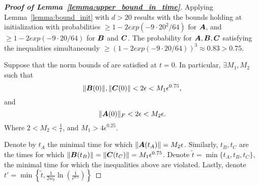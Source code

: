 \begin{proof}[\textbf{Proof of Lemma~\ref{lemma:upper_bound_in_time}}]
%
Applying Lemma~\ref{lemma:bound_init} with $d>20$ results with the bounds holding at initialization with probabilities $\ge 1-2exp(-9\cdot 20^2/64)$ for ${\bm{A}}$, and $\ge 1-2exp(-9\cdot 20/64)$ for ${\bm{B}}$ and ${\bm{C}}$. The probability for ${\bm{A}},{\bm{B}},{\bm{C}}$ satisfying the inequalities simultaneously $\ge \left(1-2exp(-9\cdot 20 /64)\right)^3\approx 0.83>0.75$.

Suppose that the norm bounds of  are satisfied at $t=0$. In particular, $\exists M_1,M_2$ such that 
\begin{equation}
    \|{\bm{B}}(0)\|,\|{\bm{C}}(0)\|<2\epsilon<M_1\epsilon^{0.75},
\end{equation}
and
\begin{equation}
    \|{\bm{A}}(0)\|_F<2\epsilon<M_2\epsilon.
\end{equation}
Where $2<M_2<\frac{1}{\epsilon}$, and $M_1>4\epsilon^{0.25}$.

Denote by $t_A$ the minimal time for which $\|{\bm{A}}(t_A)\|=M_2\epsilon$. Similarly, $t_B,t_C$ are the times for which $\|{\bm{B}}(t_B)\|=\|{\bm{C}}(t_C)\|=M_1\epsilon^{0.75}$.
Denote $\tilde{t}=\min\lbrace t_A,t_B,t_C\rbrace$, the minimal time for which the inequalities above are violated. Lastly, denote $t'=\min\left\lbrace \tilde{t}, \frac{1}{2w_0}\ln{\left(\frac{1}{\epsilon^{0.5}}\right)}\right\rbrace$






\end{proof}
